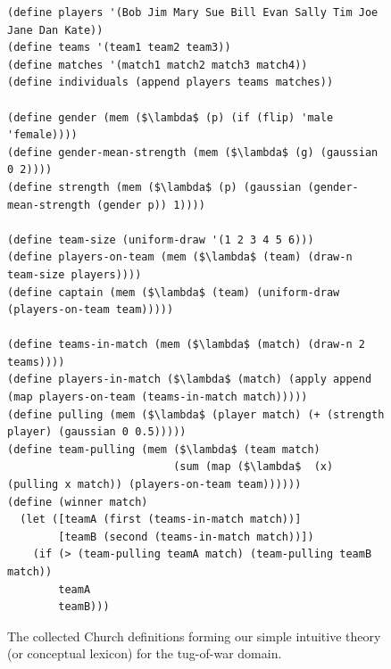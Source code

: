 \documentclass[pdfextras]{handbook}
\begin{document}
 \begin{figure}[htbp]
\begin{center}
 \begin{lstlisting}[mathescape]
(define players '(Bob Jim Mary Sue Bill Evan Sally Tim Joe Jane Dan Kate))
(define teams '(team1 team2 team3))
(define matches '(match1 match2 match3 match4))
(define individuals (append players teams matches))

(define gender (mem ($\lambda$ (p) (if (flip) 'male 'female))))
(define gender-mean-strength (mem ($\lambda$ (g) (gaussian 0 2))))
(define strength (mem ($\lambda$ (p) (gaussian (gender-mean-strength (gender p)) 1))))

(define team-size (uniform-draw '(1 2 3 4 5 6)))
(define players-on-team (mem ($\lambda$ (team) (draw-n team-size players))))
(define captain (mem ($\lambda$ (team) (uniform-draw (players-on-team team)))))

(define teams-in-match (mem ($\lambda$ (match) (draw-n 2 teams))))
(define players-in-match ($\lambda$ (match) (apply append (map players-on-team (teams-in-match match)))))
(define pulling (mem ($\lambda$ (player match) (+ (strength player) (gaussian 0 0.5)))))
(define team-pulling (mem ($\lambda$ (team match) 
                          (sum (map ($\lambda$  (x) (pulling x match)) (players-on-team team))))))
(define (winner match) 
  (let ([teamA (first (teams-in-match match))]
        [teamB (second (teams-in-match match))])
    (if (> (team-pulling teamA match) (team-pulling teamB match))
        teamA
        teamB)))
\end{lstlisting}

\caption{The collected Church definitions forming our simple intuitive theory (or conceptual lexicon) for the tug-of-war domain.}
\label{tow}
\end{center}
\end{figure}
\end{document}
